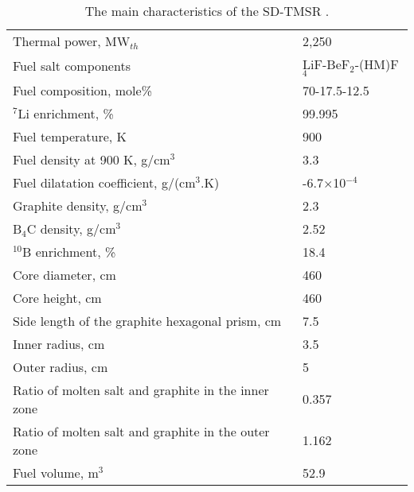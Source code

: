 \begin{table}  %
	\caption{The main characteristics of the SD-TMSR \cite{li_optimization_2018}.}
	\vspace{0.1in}
	\begin{tabularx}{\textwidth}{l | l}
		\hline
		Thermal power, MW$_{th}$          				&  2,250  \\ 
		Fuel salt components                            & LiF-BeF$_2$-(\gls{HM})F$_4$ \\
		Fuel composition, mole\%                        & 70-17.5-12.5    \\
		$^7$Li enrichment, \%        				& 99.995   \\
		Fuel temperature, K 							& 900  \\
		Fuel density at 900 K, g/cm$^3$		  		& 3.3 \\
		Fuel dilatation coefficient, g/(cm$^3$$.$K)  &  -6.7$\times$10$^{-4}$ \\
		Graphite density, g/cm$^3$             	    & 2.3	\\  
		B$_4$C density, g/cm$^3$					& 2.52  \\
		$^{10}$B enrichment, \%						&  18.4  \\
		Core diameter, cm								& 460  \\
		Core height, cm									& 460  \\
		Side length of the graphite hexagonal prism, cm   & 7.5 \\
		Inner radius, cm							& 3.5  \\
		Outer radius, cm							& 5  \\
		Ratio of molten salt and graphite in the inner zone	&  0.357  \\
		Ratio of molten salt and graphite in the outer zone &  1.162  \\
		Fuel volume, m$^3$  &	52.9 \\
		\hline
	\end{tabularx}
	\label{tab:table1}
\end{table}


